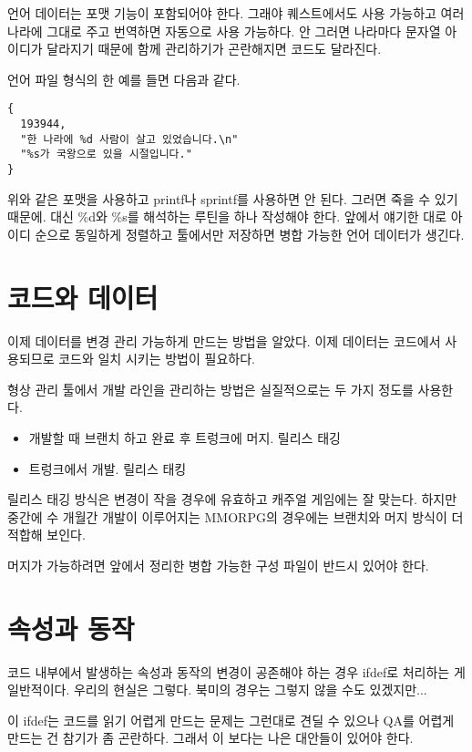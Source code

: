 \documentclass[chapter,kosection, 10.5pt, romanfixed, a4paper]{oblivoir}
\begin{document}
언어 데이터는 포맷 기능이 포함되어야 한다. 그래야 퀘스트에서도 사용 가능하고 여러 나라에 
그대로 주고 번역하면 자동으로 사용 가능하다. 안 그러면 나라마다 문자열 아이디가 달라지기 때문에
함께 관리하기가 곤란해지면 코드도 달라진다. 

언어 파일 형식의 한 예를 들면 다음과 같다. 
\begin{verbatim}
{ 
  193944, 
  "한 나라에 %d 사람이 살고 있었습니다.\n"
  "%s가 국왕으로 있을 시절입니다."
} 
\end{verbatim}

위와 같은 포맷을 사용하고 printf나 sprintf를 사용하면 안 된다. 그러면 죽을 수 있기 때문에. 
대신 \%d와 \%s를 해석하는 루틴을 하나 작성해야 한다. 앞에서 얘기한 대로 아이디 순으로 
동일하게 정렬하고 툴에서만 저장하면 병합 가능한 언어 데이터가 생긴다. 

\section{코드와 데이터}

이제 데이터를 변경 관리 가능하게 만드는 방법을 알았다. 이제 데이터는 코드에서 사용되므로 
코드와 일치 시키는 방법이 필요하다. 

형상 관리 툴에서 개발 라인을 관리하는 방법은 실질적으로는 두 가지 정도를 사용한다. 

\begin{itemize}
\item 개발할 때 브랜치 하고 완료 후 트렁크에 머지. 릴리스 태깅
\item 트렁크에서 개발. 릴리스 태킹
\end{itemize}

릴리스 태깅 방식은 변경이 작을 경우에 유효하고 캐주얼 게임에는 잘 맞는다. 하지만 중간에 
수 개월간 개발이 이루어지는 MMORPG의 경우에는 브랜치와 머지 방식이 더 적합해 보인다. 

머지가 가능하려면 앞에서 정리한 병합 가능한 구성 파일이 반드시 있어야 한다. 

\section{속성과 동작}

코드 내부에서 발생하는 속성과 동작의 변경이 공존해야 하는 경우 ifdef로 처리하는 게 
일반적이다. 우리의 현실은 그렇다. 북미의 경우는 그렇지 않을 수도 있겠지만... 

이 ifdef는 코드를 읽기 어렵게 만드는 문제는 그런대로 견딜 수 있으나 QA를 
어렵게 만드는 건 참기가 좀 곤란하다. 그래서 이 보다는 나은 대안들이 있어야 한다.
\end{document}
